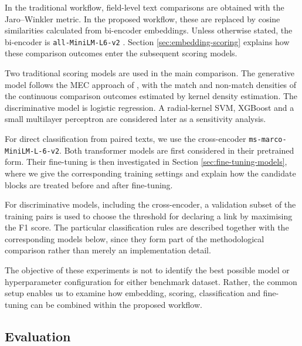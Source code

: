 In the traditional workflow, field-level text comparisons are obtained
with the Jaro--Winkler metric. In the proposed workflow, these are replaced
by cosine similarities calculated from bi-encoder embeddings. Unless
otherwise stated, the bi-encoder is
\texttt{all-MiniLM-L6-v2} \citep{reimers2019sentence}. Section
\ref{sec:embedding-scoring} explains how these comparison outcomes enter
the subsequent scoring models.

Two traditional scoring models are used in the main comparison. The
generative model follows the MEC approach of \citet{lee2021maximum},
with the match and non-match densities of the continuous comparison
outcomes estimated by kernel density estimation. The discriminative model
is logistic regression. A radial-kernel SVM, XGBoost and a small
multilayer perceptron are considered later as a sensitivity analysis.

For direct classification from paired texts, we use the cross-encoder
\texttt{ms-marco-MiniLM-L-6-v2}. Both transformer models are first
considered in their pretrained form. Their fine-tuning is then investigated
in Section \ref{sec:fine-tuning-models}, where we give the corresponding
training settings and explain how the candidate blocks are treated before
and after fine-tuning.

For discriminative models, including the cross-encoder, a validation
subset of the training pairs is used to choose the threshold for declaring
a link by maximising the F1 score. The particular classification rules are
described together with the corresponding models below, since they form
part of the methodological comparison rather than merely an implementation
detail.

The objective of these experiments is not to identify the best possible
model or hyperparameter configuration for either benchmark dataset.
Rather, the common setup enables us to examine how embedding, scoring,
classification and fine-tuning can be combined within the proposed
workflow. 


\subsection{Evaluation}
\label{sec:evaluation}

